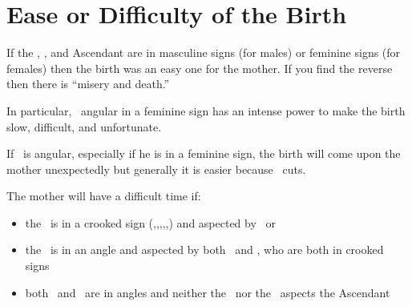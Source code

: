 \section{Ease or Difficulty of the Birth}

If the \Sun, \Moon, and Ascendant are in masculine signs (for males) or feminine signs (for females) then the birth was an easy one for the mother. If you find the reverse then there is ``misery and death.'' 

In particular, \Saturn\, angular in a feminine sign has an intense power to make the birth slow, difficult, and unfortunate.

If \Mars\, is angular, especially if he is in a feminine sign, the birth will come upon the mother unexpectedly but generally it is easier because \Mars\, cuts.

The mother will have a difficult time if:
\begin{itemize}[topsep=0.5em, itemsep=0.5em]
\item the \Moon\, is in a crooked sign (\Aries,\Taurus,\Gemini,\Capricorn,\Aquarius,\Pisces) and aspected by \Saturn\, or \Mars

\item the \Moon\, is in an angle and aspected by both \Saturn\, and \Mars, who are both in crooked signs

\item both \Saturn\, and \Mars\, are in angles and neither the \Sun\, nor the \Moon\, aspects the Ascendant
\end{itemize}
